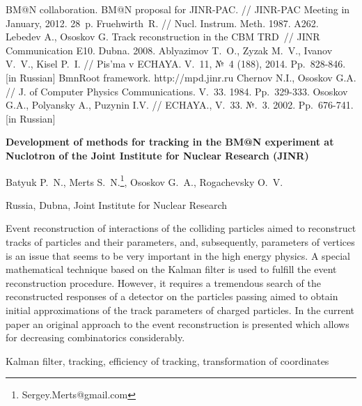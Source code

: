 \documentclass[a4paper, 12pt]{extreport}  %
\begin{document}
\begin{thebibliography}{99}
	BM@N collaboration. BM@N proposal for JINR-PAC. //
JINR-PAC Meeting in January, 2012. 28~p.
	Fruehwirth~R. // Nucl. Instrum. Meth. 1987. A262.
	Lebedev A., Ososkov G. Track reconstruction in the CBM
TRD~// JINR Communication E10. Dubna. 2008.
	 Ablyazimov T.~O., Zyzak M.~V., Ivanov V.~V., Kisel P.~I. // Pis'ma v
ECHAYA. V.~11, №~4 (188), 2014. Pp.~828-846. [in Russian]
	BmnRoot framework. http://mpd.jinr.ru
	Chernov N.I., Ososkov G.A. // J. of Computer Physics Communications. V.~33. 1984. Pp.~329-333.
	Ososkov G.A., Polyansky A., Puzynin I.V. // ECHAYA., V.~33. №.~3. 2002. Pp.~676-741. [in Russian]
\end{thebibliography}

\newpage

{\bf Development of methods for tracking in the BM@N experiment at Nuclotron of the Joint Institute for Nuclear Research (JINR)}
\newline

Batyuk P.~N., Merts S.~N.\footnote{Sergey.Merts@gmail.com}, Ososkov G.~A., Rogachevsky O.~V.
\newline

Russia, Dubna, Joint Institute for Nuclear Research
\newline

Event reconstruction of interactions of the colliding particles aimed to reconstruct tracks
of particles and their parameters, and, subsequently, parameters of vertices is an issue that seems
to be very important in the high energy physics. A special mathematical technique based on the
Kalman filter is used to fulfill the event reconstruction procedure. However, it requires a
tremendous search of the reconstructed responses of a detector on the particles passing aimed to obtain
initial approximations of the track parameters of charged particles. In the current paper an original
approach to the event reconstruction is presented which allows for decreasing combinatorics considerably.
\newline

Kalman filter, tracking, efficiency of tracking, transformation of coordinates
\end{document}
